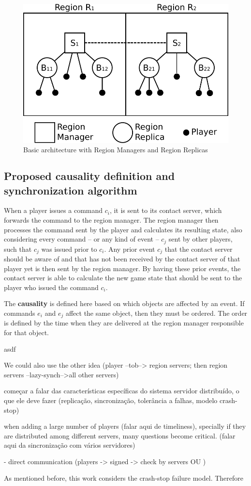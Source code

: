\documentclass[]{usiinfprospectus}
\begin{document}
\begin{figure}[!t]
	\centering
	\includegraphics[width=0.45\linewidth]{images/arch}
	\caption{Basic architecture with Region Managers and Region Replicas}
	\label{fig:arch}
\end{figure}



\subsection{Proposed causality definition and synchronization algorithm} \label{sec:algorithm}

When a player issues a command $c_{i}$, it is sent to its contact server, which forwards the command to the region manager. The region manager then processes the command sent by the player and calculates its resulting state, also considering every command -- or any kind of event -- $c_{j}$ sent by other players, such that $c_{j}$ was issued prior to $c_{i}$. Any prior event $c_{j}$ that the contact server should be aware of and that has not been received by the contact server of that player yet is then sent by the region manager. By having these prior events, the contact server is able to calculate the new game state that should be sent to the player who issued the command $c_{i}$.

The \textbf{causality} is defined here based on which objects are affected by an event. If commands $e_{i}$ and $e_{j}$ affect the same object, then they must be ordered. The order is defined by the time when they are delivered at the region manager responsible for that object.

asdf

We could also use the other idea (player --tob--> region servers; then region servers --lazy-synch-->all other servers)



começar a falar das características específicas do sistema servidor distribuído, o que ele deve fazer (replicação, sincronização, tolerância a falhas, modelo crash-stop)

when adding a large number of players (falar aqui de timeliness), specially if they are distributed among different servers, many questions become critical. (falar aqui da sincronização com vários servidores)

- direct communication (players -> signed -> check by servers OU )


As mentioned before, this work considers the crash-stop failure model. Therefore



\end{document}

